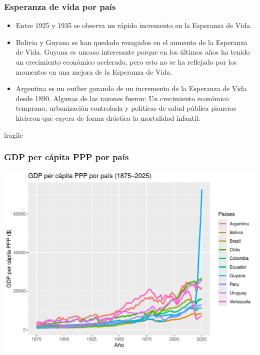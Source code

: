 \documentclass{beamer}
\begin{document}
\begin{frame}[fragile]
\frametitle{Esperanza de vida por país}
\begin{itemize}
\item<1> Entre 1925 y 1935 se observa un rápido incremento en la Esperanza de Vida.
\item<2> Bolivia y Guyana se han quedado rezagados en el aumento de la Esperanza de Vida. Guyana es uncaso interesante porque en los últimos años ha tenido un crecimiento económico acelerado, pero esto no se ha reflejado por los momentos en una mejora de la Esperanza de Vida.
\item<3> Argentina es un outlier gozando de un incremento de la Esperanza de Vida desde 1890. Algunas de las razones fueron: Un crecimiento económico temprano, urbanización controlada y políticas de salud pública pioneras hicieron que cayera de forma drástica la mortalidad infantil.
\end{itemize}
\end{frame}


\begin{frame}{fragile}
\frametitle{GDP per cápita PPP por país}
\includegraphics{presentacion_Parada_G_M8R2-004}
\end{frame}
\end{document}

